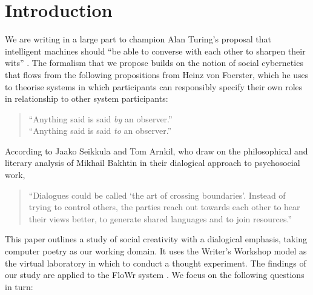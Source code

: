 \section{Introduction}
\label{sec:intro}


We are writing in a large part to champion Alan Turing's
proposal that intelligent machines should ``be able to converse with
each other to sharpen their wits'' \cite{turing-intelligent}. 
%
The formalism that we propose builds on the notion of social cybernetics that flows
from the following propositions from Heinz von Foerster, which he uses to theorise systems
in which participants can responsibly specify their own roles in relationship to
other system participants:

\begin{quote}
``Anything said is said \emph{by} an observer.'' \\
``Anything said is said \emph{to} an observer.''\\
\end{quote}

According to Jaako Seikkula and Tom Arnkil, who draw on the philosophical and literary analysis of Mikhail Bakhtin \cite{bakhtin2010toward,bakhtin1984problems} in their dialogical approach to psychosocial work,
\begin{quote}
``Dialogues could be called `the art of crossing boundaries'.  Instead of trying to control others, the parties reach out towards each other to hear their views better, to generate shared languages and to join resources.''
\end{quote}

This paper outlines a study of social creativity with a dialogical emphasis, taking computer
poetry as our working domain.  It uses the Writer's Workshop model
\cite{gabriel2002writer} as the virtual laboratory in which to conduct a thought experiment.
The findings of our study are applied to the FloWr system \cite{charnley2014flowr}. 
We focus on the following questions in turn:


